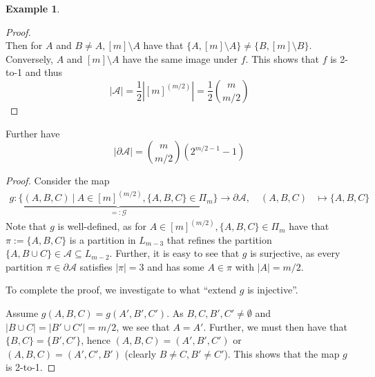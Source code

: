 \documentclass{scrartcl}
\theoremstyle{definition}
\newtheorem{example}[definition]{Example}
\begin{document}
\begin{example}
\begin{proof}
\begin{equation*}
        \end{equation*}
        Then for $A$ and $B \neq A, [m] \setminus A$ have that $\{ A, [m] \setminus A \} \neq \{ B, [m] \setminus B \}$.
        Conversely, $A$ and $[m] \setminus A$ have the same image under $f$.
        This shows that $f$ is 2-to-1 and thus 
        \begin{equation*}
            |\mathcal{A}| = \frac 1 2 \left| [m]^{(m/2)} \right| = \frac 1 2 {m \choose m/2}
        \end{equation*}
    \end{proof}
    Further have
    \begin{equation*}
        |\partial \mathcal{A}| = {m \choose m/2} \left( 2^{m/2 - 1} - 1 \right)
    \end{equation*}
    \begin{proof}
        Consider the map
        \begin{align*}
            g: \underbrace{\{ (A, B, C) \ | \ A \in [m]^{(m/2)}, \{ A, B, C \} \in \Pi_m \}}_{ =: \mathcal{G} } \to \partial \mathcal{A}, \quad (A, B, C) &\mapsto \{ A, B, C \}
        \end{align*}
        Note that $g$ is well-defined, as for $A \in [m]^{(m/2)}, \{ A, B, C \} \in \Pi_m$ have that $\pi := \{ A, B, C \}$ is a partition in $L_{m - 3}$ that refines the partition $\{ A, B \cup C \} \in \mathcal{A} \subseteq L_{m - 2}$.
        Further, it is easy to see that $g$ is surjective, as every partition $\pi \in \partial \mathcal{A}$ satisfies $|\pi| = 3$ and has some $A \in \pi$ with $|A| = m/2$.

        To complete the proof, we investigate to what ``extend $g$ is injective''.

        Assume $g(A, B, C) = g(A', B', C')$. As $B, C, B', C' \neq \emptyset$ and $|B \cup C| = |B' \cup C'| = m/2$, we see that $A = A'$.
        Further, we must then have that $\{ B, C \} = \{ B', C' \}$, hence $(A, B, C) = (A', B', C')$ or $(A, B, C) = (A', C', B')$ (clearly $B \neq C, B' \neq C'$).
        This shows that the map $g$ is 2-to-1.
        

\end{proof}
\end{example}
\end{document}
